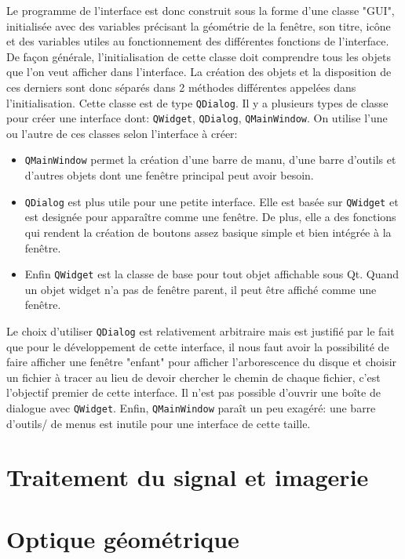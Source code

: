 \documentclass[a4paper,11pt]{article}
\begin{document}
Le programme de l'interface est donc construit sous la forme d'une classe "GUI", initialisée avec des variables précisant la géométrie de la fenêtre, son titre, icône et des variables utiles au fonctionnement des différentes fonctions de l'interface. De façon générale, l'initialisation de cette classe doit comprendre tous les objets que l'on veut afficher dans l'interface. La création des objets et la disposition de ces derniers sont donc séparés dans 2 méthodes différentes appelées dans l'initialisation. Cette classe est de type \verb|QDialog|. Il y a plusieurs types de classe pour créer une interface dont: \verb|QWidget|, \verb|QDialog|, \verb|QMainWindow|. On utilise l'une ou l'autre de ces classes selon l'interface à créer: 
\begin{itemize}
	\item \verb|QMainWindow| permet la création d'une barre de manu, d'une barre d'outils et d'autres objets dont une fenêtre principal peut avoir besoin.
	\item \verb|QDialog| est plus utile pour une petite interface. Elle est basée sur \verb|QWidget| et est designée pour apparaître comme une fenêtre. De plus, elle a des fonctions qui rendent la création de boutons assez basique simple et bien intégrée à la fenêtre.
	\item Enfin \verb|QWidget| est la classe de base pour tout objet affichable sous Qt. Quand un objet widget n'a pas de fenêtre parent, il peut être affiché comme une fenêtre. 
\end{itemize}

Le choix d'utiliser \verb|QDialog| est relativement arbitraire mais est justifié par le fait que pour le développement de cette interface, il nous faut avoir la possibilité de faire afficher une fenêtre "enfant" pour afficher l'arborescence du disque et choisir un fichier à tracer au lieu de devoir chercher le chemin de chaque fichier, c'est l'objectif premier de cette interface. Il n'est pas possible d'ouvrir une boîte de dialogue avec \verb|QWidget|. Enfin, \verb|QMainWindow| paraît un peu exagéré: une barre d'outils/ de menus est inutile pour une interface de cette taille.


\section{Traitement du signal et imagerie}
\section{Optique géométrique}
\end{document}
